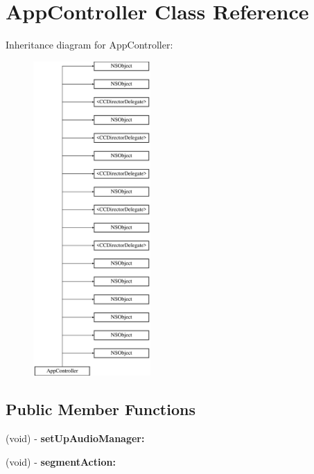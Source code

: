 \hypertarget{interface_app_controller}{\section{App\-Controller Class Reference}
\label{interface_app_controller}
}
Inheritance diagram for App\-Controller\-:\begin{figure}[H]
\begin{center}
\leavevmode
\includegraphics[height=12.000000cm]{interface_app_controller}
\end{center}
\end{figure}
\subsection*{Public Member Functions}
\begin{DoxyCompactItemize}
\item 
\hypertarget{interface_app_controller_a9289dba61fd0da72f5802f44048d5aa4}{(void) -\/ {\bfseries set\-Up\-Audio\-Manager\-:}}\label{interface_app_controller_a9289dba61fd0da72f5802f44048d5aa4}

\item 
\hypertarget{interface_app_controller_a57f1ef74d784997ed8c3696be59b77fe}{(void) -\/ {\bfseries segment\-Action\-:}}\label{interface_app_controller_a57f1ef74d784997ed8c3696be59b77fe}

\end{DoxyCompactItemize}
